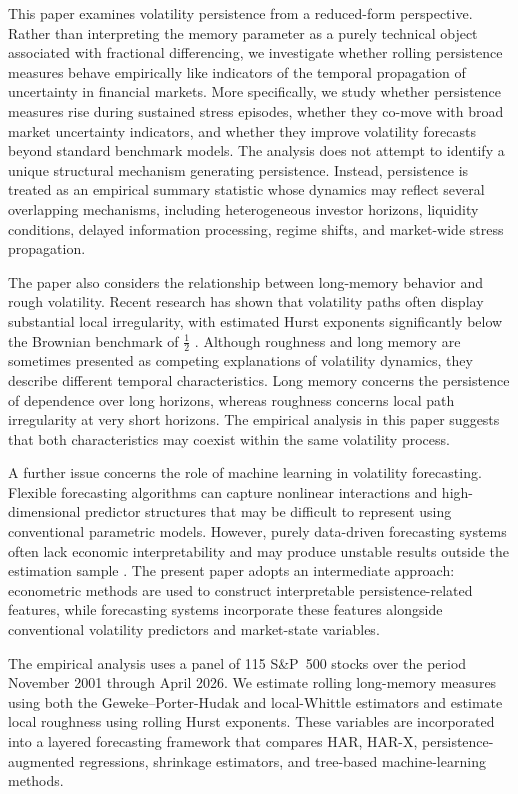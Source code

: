\documentclass[unnumsec,webpdf,contemporary,large]{oup-authoring-template}%
\theoremstyle{thmstyleone}%
\theoremstyle{thmstyletwo}%
\theoremstyle{thmstylethree}%
\begin{document}
This paper examines volatility persistence from a reduced-form perspective.
Rather than interpreting the memory parameter as a purely technical object
associated with fractional differencing, we investigate whether rolling
persistence measures behave empirically like indicators of the temporal
propagation of uncertainty in financial markets. More specifically, we study
whether persistence measures rise during sustained stress episodes, whether
they co-move with broad market uncertainty indicators, and whether they
improve volatility forecasts beyond standard benchmark models. The analysis
does not attempt to identify a unique structural mechanism generating
persistence. Instead, persistence is treated as an empirical summary
statistic whose dynamics may reflect several overlapping mechanisms,
including heterogeneous investor horizons, liquidity conditions, delayed
information processing, regime shifts, and market-wide stress propagation.

The paper also considers the relationship between long-memory behavior and
rough volatility. Recent research has shown that volatility paths often
display substantial local irregularity, with estimated Hurst exponents
significantly below the Brownian benchmark of $\frac{1}{2}$
\citep{gatheral2018volatility,bennedsen2021decoupling}. Although roughness
and long memory are sometimes presented as competing explanations of
volatility dynamics, they describe different temporal characteristics. Long
memory concerns the persistence of dependence over long horizons, whereas
roughness concerns local path irregularity at very short horizons. The
empirical analysis in this paper suggests that both characteristics may
coexist within the same volatility process.

A further issue concerns the role of machine learning in volatility
forecasting. Flexible forecasting algorithms can capture nonlinear
interactions and high-dimensional predictor structures that may be difficult
to represent using conventional parametric models. However, purely
data-driven forecasting systems often lack economic interpretability and may
produce unstable results outside the estimation sample
\citep{gu2020empirical}. The present paper adopts an intermediate approach:
econometric methods are used to construct interpretable persistence-related
features, while forecasting systems incorporate these features alongside
conventional volatility predictors and market-state variables.

The empirical analysis uses a panel of 115 S\&P~500 stocks over the period
November 2001 through April 2026. We estimate rolling long-memory measures
using both the Geweke--Porter-Hudak and local-Whittle estimators and
estimate local roughness using rolling Hurst exponents. These variables are
incorporated into a layered forecasting framework that compares HAR, HAR-X,
persistence-augmented regressions, shrinkage estimators, and tree-based
machine-learning methods.
\end{document}
